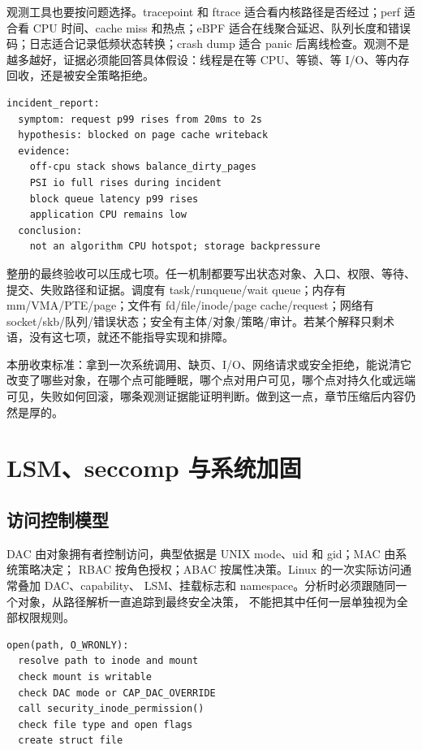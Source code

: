 观测工具也要按问题选择。tracepoint 和 ftrace 适合看内核路径是否经过；perf 适合看 CPU 时间、cache miss 和热点；eBPF 适合在线聚合延迟、队列长度和错误码；日志适合记录低频状态转换；crash dump 适合 panic 后离线检查。观测不是越多越好，证据必须能回答具体假设：线程是在等 CPU、等锁、等 I/O、等内存回收，还是被安全策略拒绝。

\begin{lstlisting}
incident_report:
  symptom: request p99 rises from 20ms to 2s
  hypothesis: blocked on page cache writeback
  evidence:
    off-cpu stack shows balance_dirty_pages
    PSI io full rises during incident
    block queue latency p99 rises
    application CPU remains low
  conclusion:
    not an algorithm CPU hotspot; storage backpressure
\end{lstlisting}

整册的最终验收可以压成七项。任一机制都要写出状态对象、入口、权限、等待、提交、失败路径和证据。调度有 task/runqueue/wait queue；内存有 mm/VMA/PTE/page；文件有 fd/file/inode/page cache/request；网络有 socket/skb/队列/错误状态；安全有主体/对象/策略/审计。若某个解释只剩术语，没有这七项，就还不能指导实现和排障。

\begin{rubricbox}
本册收束标准：拿到一次系统调用、缺页、I/O、网络请求或安全拒绝，能说清它改变了哪些对象，在哪个点可能睡眠，哪个点对用户可见，哪个点对持久化或远端可见，失败如何回滚，哪条观测证据能证明判断。做到这一点，章节压缩后内容仍然是厚的。
\end{rubricbox}

\section{LSM、seccomp 与系统加固}

\subsection{访问控制模型}

DAC 由对象拥有者控制访问，典型依据是 UNIX mode、uid 和 gid；MAC 由系统策略决定；
RBAC 按角色授权；ABAC 按属性决策。Linux 的一次实际访问通常叠加 DAC、capability、
LSM、挂载标志和 namespace。分析时必须跟随同一个对象，从路径解析一直追踪到最终安全决策，
不能把其中任何一层单独视为全部权限规则。

\begin{lstlisting}
open(path, O_WRONLY):
  resolve path to inode and mount
  check mount is writable
  check DAC mode or CAP_DAC_OVERRIDE
  call security_inode_permission()
  check file type and open flags
  create struct file
\end{lstlisting}


